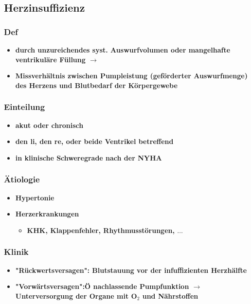 	\subsection{Herzinsuffizienz}
		\subsubsection{Def}
			\begin{itemize}
				\item \textbf{durch unzureichendes syst. Auswurfvolumen oder mangelhafte ventrikuläre Füllung $\rightarrow$}
				\item \textbf{Missverhältnis zwischen Pumpleistung (geförderter Auswurfmenge) des Herzens und Blutbedarf der Körpergewebe}
			\end{itemize}
		\subsubsection{Einteilung}
			\begin{itemize}
				\item \textbf{akut oder chronisch}
				\item \textbf{den li, den re, oder beide Ventrikel betreffend}
				\item \textbf{in klinische Schweregrade nach der NYHA}
			\end{itemize}
		\subsubsection{Ätiologie}
			\begin{itemize}
				\item \textbf{Hypertonie}
				\item \textbf{Herzerkrankungen}
					\begin{itemize}
						\item \textbf{KHK, Klappenfehler, Rhythmusstörungen, $\dots$}
					\end{itemize}
			\end{itemize}
		\subsubsection{Klinik}
			\begin{itemize}
				\item \textbf{"Rückwertsversagen": Blutstauung vor der infuffizienten Herzhälfte}
				\item \textbf{"Vorwärtsversagen":Ö nachlassende Pumpfunktion $\rightarrow$ Unterversorgung der Organe mit O$_2$ und Nährstoffen}
			\end{itemize}
